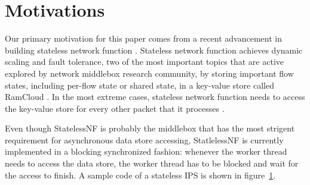 \section{Motivations}

Our primary motivation for this paper comes from a recent advancement in building stateless network function \cite{}. Stateless network function \cite{} achieves dynamic scaling and fault tolerance, two of the most important topics that are active explored by network middlebox research community, by storing important flow states, including per-flow state or shared state, in a key-value store called RamCloud \cite{}. In the most extreme cases, stateless network function needs to access the key-value store for every other packet that it processes \cite{}.

Even though StatelessNF is probably the middlebox that has the most strigent requirement for asynchronous data store accessing, StatlelessNF is currently implemented in a blocking synchronized fashion: whenever the worker thread needs to access the data store, the worker thread has to be blocked and wait for the access to finish. A sample code of a stateless IPS is shown in figure~\ref{}.

